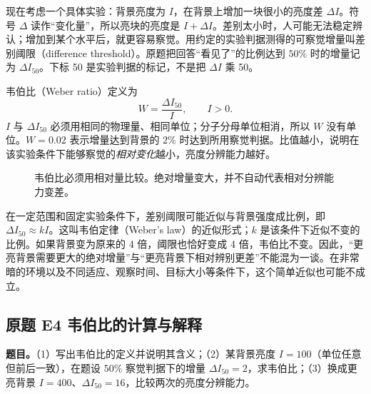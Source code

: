 现在考虑一个具体实验：背景亮度为 $I$，在背景上增加一块很小的亮度差 $\Delta I$。符号 $\Delta$ 读作“变化量”，所以亮块的亮度是 $I+\Delta I$。差别太小时，人可能无法稳定辨认；增加到某个水平后，就更容易察觉。用约定的实验判据测得的可察觉增量叫差别阈限（difference threshold）。原题把回答“看见了”的比例达到 $50\%$ 时的增量记为 $\Delta I_{50}$。下标 50 是实验判据的标记，不是把 $\Delta I$ 乘 50。

韦伯比（Weber ratio）定义为
\[
  W=\frac{\Delta I_{50}}{I},\qquad I>0.
\]
$I$ 与 $\Delta I_{50}$ 必须用相同的物理量、相同单位；分子分母单位相消，所以 $W$ 没有单位。$W=0.02$ 表示增量达到背景的 $2\%$ 时达到所用察觉判据。比值越小，说明在该实验条件下能够察觉的\emph{相对变化}越小，亮度分辨能力越好。

\begin{figure}[htbp]
\centering
{}
\caption{韦伯比必须用相对量比较。绝对增量变大，并不自动代表相对分辨能力变差。}
\end{figure}

在一定范围和固定实验条件下，差别阈限可能近似与背景强度成比例，即 $\Delta I_{50}\approx kI$。这叫韦伯定律（Weber's law）的近似形式；$k$ 是该条件下近似不变的比例。如果背景变为原来的 4 倍，阈限也恰好变成 4 倍，韦伯比不变。因此，“更亮背景需要更大的绝对增量”与“更亮背景下相对辨别更差”不能混为一谈。在非常暗的环境以及不同适应、观察时间、目标大小等条件下，这个简单近似也可能不成立。

\subsection*{原题 E4 韦伯比的计算与解释}
\label{original:E4}
\textbf{题目。}（1）写出韦伯比的定义并说明其含义；（2）某背景亮度 $I=100$（单位任意但前后一致），在题设 $50\%$ 察觉判据下的增量 $\Delta I_{50}=2$，求韦伯比；（3）换成更亮背景 $I=400$、$\Delta I_{50}=16$，比较两次的亮度分辨能力。

